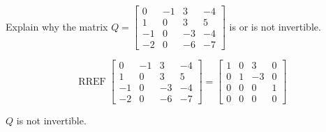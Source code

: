 
\begin{exerciseStatement}


Explain why the matrix \(Q= \left[\begin{array}{cccc}
0 & -1 & 3 & -4 \\
1 & 0 & 3 & 5 \\
-1 & 0 & -3 & -4 \\
-2 & 0 & -6 & -7
\end{array}\right] \) is or is not invertible.


\end{exerciseStatement}
    
\begin{exerciseAnswer} 


\[\operatorname{RREF} \left[\begin{array}{cccc}
0 & -1 & 3 & -4 \\
1 & 0 & 3 & 5 \\
-1 & 0 & -3 & -4 \\
-2 & 0 & -6 & -7
\end{array}\right] = \left[\begin{array}{cccc}
1 & 0 & 3 & 0 \\
0 & 1 & -3 & 0 \\
0 & 0 & 0 & 1 \\
0 & 0 & 0 & 0
\end{array}\right] \]

\(Q\) is not invertible.
\end{exerciseAnswer}
    
